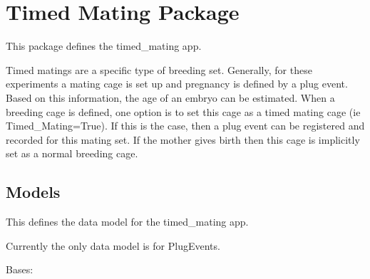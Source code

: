 \documentclass[letterpaper,10pt,english]{sphinxmanual}
\begin{document}
\begin{fulllineitems}
\begin{fulllineitems}

\begin{fulllineitems}
\label{api:animal.tests.BreedingViewTests.test_breeding_list_all}
\end{fulllineitems}


\begin{fulllineitems}
\label{api:animal.tests.BreedingViewTests.test_breeding_new}
\end{fulllineitems}


\end{fulllineitems}



\section{Timed Mating Package}
\label{api:module-timed_mating}\label{api:timed-mating-package}
This package defines the timed\_mating app.

Timed matings are a specific type of breeding set.  
Generally, for these experiments a mating cage is set up and pregnancy is defined by a plug event.  
Based on this information, the age of an embryo can be estimated.  
When a breeding cage is defined, one option is to set this cage as a timed mating cage (ie Timed\_Mating=True).  
If this is the case, then a plug event can be registered and recorded for this mating set.  
If the mother gives birth then this cage is implicitly set as a normal breeding cage.


\subsection{Models}
\label{api:id6}\label{api:module-timed_mating.models}
This defines the data model for the timed\_mating app.

Currently the only data model is for PlugEvents.

\begin{fulllineitems}
\label{api:timed_mating.models.PlugEvents}
Bases: 


\end{fulllineitems}
\end{fulllineitems}
\end{document}
